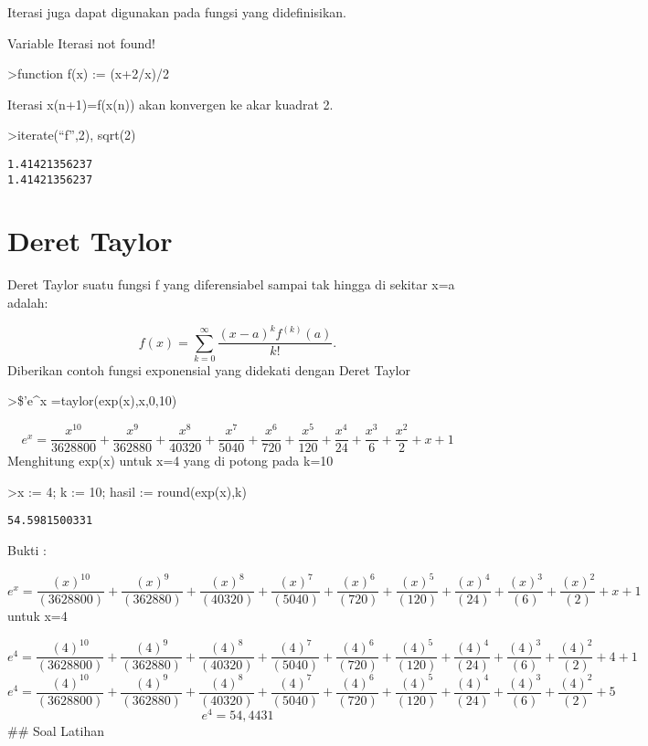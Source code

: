 \documentclass[
]{book}
\begin{document}
Iterasi juga dapat digunakan pada fungsi yang didefinisikan.

Variable Iterasi not found!

\textgreater function f(x) := (x+2/x)/2

Iterasi x(n+1)=f(x(n)) akan konvergen ke akar kuadrat 2.

\textgreater iterate(``f'',2), sqrt(2)

\begin{verbatim}
1.41421356237
1.41421356237
\end{verbatim}

\section{Deret Taylor}\label{deret-taylor}

Deret Taylor suatu fungsi f yang diferensiabel sampai tak hingga di sekitar x=a adalah:

\[f(x) = \sum_{k=0}^\infty \frac{(x-a)^k f^{(k)}(a)}{k!}.\]Diberikan contoh fungsi exponensial yang didekati dengan Deret Taylor

\textgreater\$'e\^{}x =taylor(exp(x),x,0,10)

\[e^{x}=\frac{x^{10}}{3628800}+\frac{x^9}{362880}+\frac{x^8}{40320}+  \frac{x^7}{5040}+\frac{x^6}{720}+\frac{x^5}{120}+\frac{x^4}{24}+  \frac{x^3}{6}+\frac{x^2}{2}+x+1\]Menghitung exp(x) untuk x=4 yang di potong pada k=10

\textgreater x := 4; k := 10; hasil := round(exp(x),k)

\begin{verbatim}
54.5981500331
\end{verbatim}

Bukti :

\[e^x = \frac{(x)^{10}}{(3628800)} + \frac{(x)^{9}}{(362880)} + \frac{(x)^{8}}{(40320)} + \frac{(x)^{7}}{(5040)} + \frac{(x)^{6}}{(720)} + \frac{(x)^{5}}{(120)} + \frac{(x)^{4}}{(24)} + \frac{(x)^{3}}{(6)} + \frac{(x)^{2}}{(2)} + x + 1\]untuk x=4

\[e^4 = \frac{(4)^{10}}{(3628800)} + \frac{(4)^{9}}{(362880)} + \frac{(4)^{8}}{(40320)} + \frac{(4)^{7}}{(5040)} + \frac{(4)^{6}}{(720)} + \frac{(4)^{5}}{(120)} + \frac{(4)^{4}}{(24)} + \frac{(4)^{3}}{(6)} + \frac{(4)^{2}}{(2)} + 4 + 1\]\[e^4 = \frac{(4)^{10}}{(3628800)} + \frac{(4)^{9}}{(362880)} + \frac{(4)^{8}}{(40320)} + \frac{(4)^{7}}{(5040)} + \frac{(4)^{6}}{(720)} + \frac{(4)^{5}}{(120)} + \frac{(4)^{4}}{(24)} + \frac{(4)^{3}}{(6)} + \frac{(4)^{2}}{(2)} + 5\]\[e^4 = 54,4431\]\#\# Soal Latihan
\end{document}
